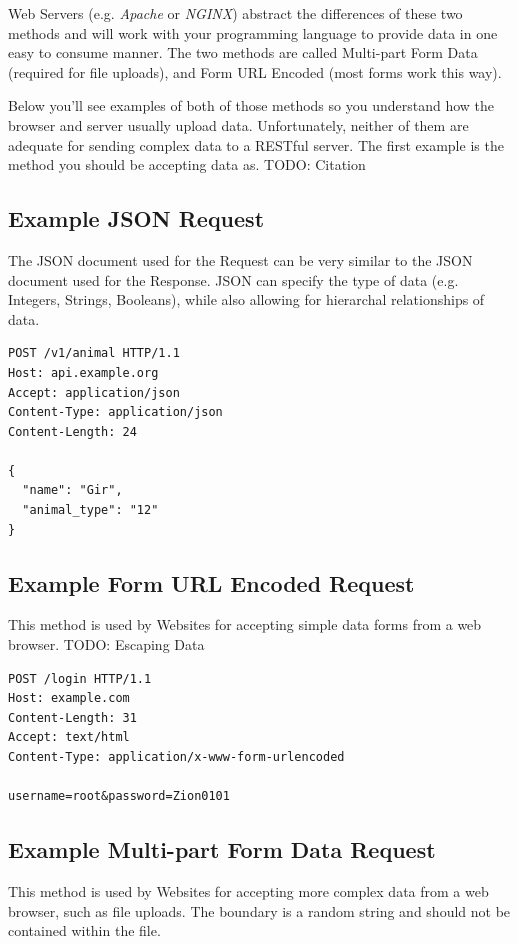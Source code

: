 \documentclass{book}
\begin{document}
Web Servers (e.g. \emph{Apache} or \emph{NGINX}) abstract the differences of these two methods and will work with your programming language to provide data in one easy to consume manner. The two methods are called Multi-part Form Data (required for file uploads), and Form URL Encoded (most forms work this way).

Below you'll see examples of both of those methods so you understand how the browser and server usually upload data. Unfortunately, neither of them are adequate for sending complex data to a RESTful server. The first example is the method you should be accepting data as. TODO: Citation

\subsection{Example JSON Request}

The JSON document used for the Request can be very similar to the JSON document used for the Response. JSON can specify the type of data (e.g. Integers, Strings, Booleans), while also allowing for hierarchal relationships of data.

\begin{verbatim}
POST /v1/animal HTTP/1.1
Host: api.example.org
Accept: application/json
Content-Type: application/json
Content-Length: 24

{
  "name": "Gir",
  "animal_type": "12"
}
\end{verbatim}

\subsection{Example Form URL Encoded Request}

This method is used by Websites for accepting simple data forms from a web browser. TODO: Escaping Data

\begin{verbatim}
POST /login HTTP/1.1
Host: example.com
Content-Length: 31
Accept: text/html
Content-Type: application/x-www-form-urlencoded

username=root&password=Zion0101
\end{verbatim}

\subsection{Example Multi-part Form Data Request}

This method is used by Websites for accepting more complex data from a web browser, such as file uploads. The boundary is a random string and should not be contained within the file.
\end{document}

